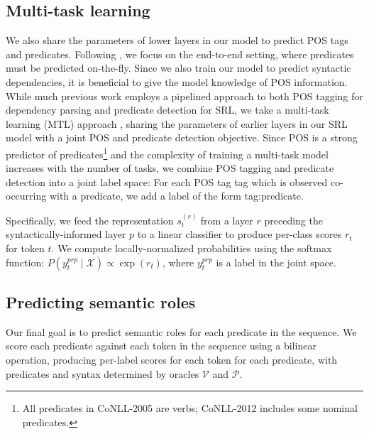 \documentclass[11pt,a4paper]{article}
\begin{document}
\subsection{Multi-task learning \label{sec:MTL}}
We also share the parameters of lower layers in our model to predict POS tags and predicates. Following \citet{he2017deep}, we focus on the end-to-end setting, %
where predicates must be predicted on-the-fly. Since we also train our model to predict syntactic dependencies, it is beneficial to give the model knowledge of POS information. While much previous work employs a pipelined approach to both POS tagging for dependency parsing and predicate detection for SRL, we take a multi-task learning (MTL) approach \citep{caruana1993multitask}, sharing the parameters of earlier layers in our SRL model with a joint POS and predicate detection objective. Since POS is a strong predictor of predicates\footnote{All predicates in CoNLL-2005 are verbs; CoNLL-2012 includes some nominal predicates.} 
and the complexity of training a multi-task model increases with the number of tasks, we combine POS tagging and predicate detection into a joint label space: For each POS tag {\sc tag} which is observed co-occurring with a predicate, we add a label of the form {\sc tag:predicate}.%

Specifically, we feed the representation $s_t^{(r)}$ from a layer $r$ preceding the syntactically-informed layer $p$ to a linear classifier to produce per-class scores $r_t$ for token $t$. We compute locally-normalized probabilities using the softmax function: $P(y_t^{prp} \mid \mathcal{X}) \propto \exp(r_t)$, where $y_t^{prp}$ is a label in the joint space. 

\subsection{Predicting semantic roles \label{sec:srl}}
Our final goal is to predict semantic roles for each predicate in the sequence. We score each predicate
against each token in the sequence using a bilinear operation, producing per-label scores for each token for each predicate, with predicates and syntax determined by oracles $\mathcal{V}$ and $\mathcal{P}$. 
\end{document}
